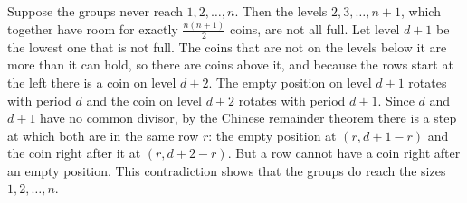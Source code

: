 Suppose the groups never reach $1, 2, \ldots, n$. Then the levels $2, 3, \ldots, n+1$, which together have room for exactly
$\frac{n(n+1)}{2}$ coins, are not all full. Let level $d+1$ be the lowest one that is not full.
The coins that are not on the levels below it are more than it can hold, so there are coins above it, and because the rows start
at the left there is a coin on level $d+2$.
The empty position on level $d+1$ rotates with period $d$ and the coin on level $d+2$ rotates with period $d+1$.
Since $d$ and $d+1$ have no common divisor, by the Chinese remainder theorem there is a step at which both are in the same row $r$:
the empty position at $(r, d+1-r)$ and the coin right after it at $(r, d+2-r)$.
But a row cannot have a coin right after an empty position. This contradiction shows that the groups do reach the sizes $1, 2, \ldots, n$.
